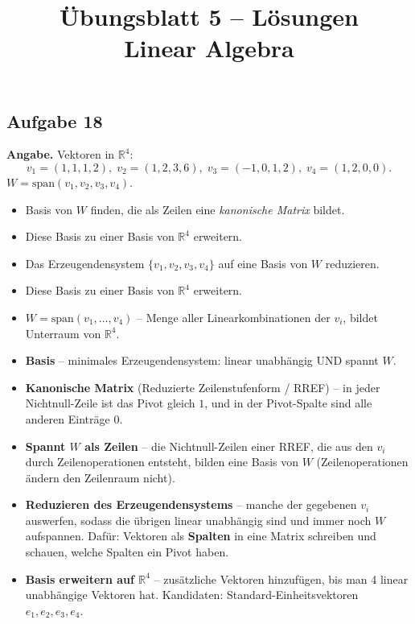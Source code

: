 \documentclass[a4paper,12pt]{article}
\title{\"Ubungsblatt 5 -- L\"osungen \\ \large Linear Algebra}
\author{}
\date{}
\begin{document}
\maketitle

\subsection*{Aufgabe 18}

\textbf{Angabe.} Vektoren in $\mathbb{R}^4$:
\[
v_1 = (1,1,1,2),\; v_2 = (1,2,3,6),\; v_3 = (-1,0,1,2),\; v_4 = (1,2,0,0).
\]
$W = \text{span}(v_1, v_2, v_3, v_4)$.
\begin{itemize}[nosep]
\item[(a)] Basis von $W$ finden, die als Zeilen eine \textit{kanonische Matrix} bildet.
\item[(b)] Diese Basis zu einer Basis von $\mathbb{R}^4$ erweitern.
\item[(c)] Das Erzeugendensystem $\{v_1, v_2, v_3, v_4\}$ auf eine Basis von $W$ reduzieren.
\item[(d)] Diese Basis zu einer Basis von $\mathbb{R}^4$ erweitern.
\end{itemize}

\begin{begriffe}
\begin{itemize}[leftmargin=*, nosep]
    \item $W = \text{span}(v_1, \dots, v_4)$ -- Menge aller Linearkombinationen der $v_i$, bildet Unterraum von $\mathbb{R}^4$.
    \item \textbf{Basis} -- minimales Erzeugendensystem: linear unabh\"angig UND spannt $W$.
    \item \textbf{Kanonische Matrix} (Reduzierte Zeilenstufenform / RREF) -- in jeder Nichtnull-Zeile ist das Pivot gleich $1$, und in der Pivot-Spalte sind alle anderen Eintr\"age $0$.
    \item \textbf{Spannt $W$ als Zeilen} -- die Nichtnull-Zeilen einer RREF, die aus den $v_i$ durch Zeilenoperationen entsteht, bilden eine Basis von $W$ (Zeilenoperationen \"andern den Zeilenraum nicht).
    \item \textbf{Reduzieren des Erzeugendensystems} -- manche der gegebenen $v_i$ auswerfen, sodass die \"ubrigen linear unabh\"angig sind und immer noch $W$ aufspannen. Daf\"ur: Vektoren als \textbf{Spalten} in eine Matrix schreiben und schauen, welche Spalten ein Pivot haben.
    \item \textbf{Basis erweitern auf $\mathbb{R}^4$} -- zus\"atzliche Vektoren hinzuf\"ugen, bis man 4 linear unabh\"angige Vektoren hat. Kandidaten: Standard-Einheitsvektoren $e_1, e_2, e_3, e_4$.
\end{itemize}
\end{begriffe}
\end{document}
